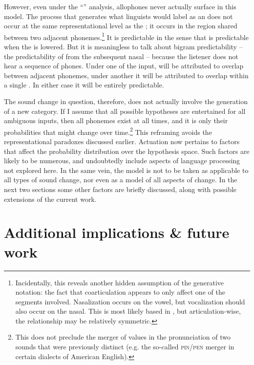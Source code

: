 However, even under the “” analysis, allophones never
actually surface in this model. The process that generates what linguists
would label as an  does not occur at the same representational
level as the ; it occurs in the region shared between two adjacent
phonemes.\footnote{Incidentally, this reveals another hidden assumption of the generative
notation: the fact that coarticulation appears to only affect one
of the segments involved. Nasalization occurs on the vowel, but vocalization
should also occur on the nasal. This  is most likely based in
, but articulation-wise, the  relationship may
be relatively symmetric.} It is predictable in the sense that  is predictable when
the  is lowered. But it is meaningless to talk about bigram predictability
– the predictability of  from the subsequent nasal –
because the listener does not hear a sequence of phones. Under one
 of the input,  will be attributed to 
overlap between adjacent phonemes, under another it will be attributed
to  overlap within a single . In either case it will
be entirely predictable. 

The sound change in question, therefore, does not actually involve
the generation of a new  category. If I assume that all possible
hypotheses are entertained for all ambiguous inputs, then all phonemes
exist at all times, and it is only their probabilities that might
change over time.\footnote{This does not preclude the merger of  values in the pronunciation
of two sounds that were previously distinct (e.g. the so-called \textsc{pin\slash pen}
merger in certain dialects of American English).} This reframing avoids the representational paradoxes discussed
earlier. Actuation now pertains to factors that affect the probability
distribution over the hypothesis space. Such factors are likely to
be numerous, and undoubtedly include aspects of language processing
not explored here. In the same vein, the  model
is not to be taken as applicable to all types of sound change, nor
even as a model of all aspects of  change. In
the next two sections some other factors are briefly discussed, along
with possible extensions of the current work.

\section{Additional implications \& future work}

